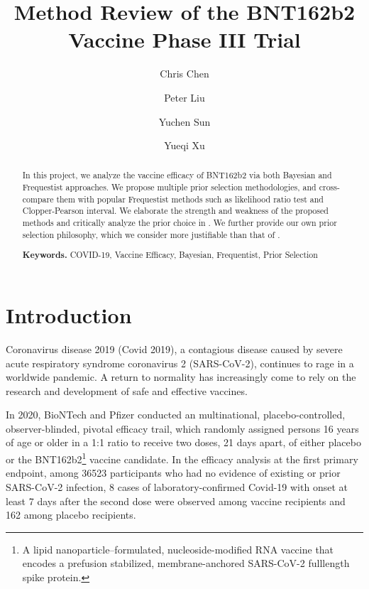 \documentclass[12pt]{amsart}
\begin{document}
\author{Chris Chen}
\author{Peter Liu}
\author{Yuchen Sun}
\author{Yueqi Xu}
\title{Method Review of the BNT162b2 Vaccine Phase III Trial}

\begin{abstract}

In this project, we analyze the vaccine efficacy of BNT162b2 via both Bayesian and Frequestist approaches. We propose multiple prior selection methodologies, and cross-compare them with popular Frequestist methods such as likelihood ratio test and Clopper-Pearson interval. We elaborate the strength and weakness of the proposed methods and critically analyze the prior choice in \cite{paper}. We further provide our own prior selection philosophy, which we consider more justifiable than that of \cite{paper}.
\smallskip

\noindent \textbf{Keywords.} COVID-19, Vaccine Efficacy, Bayesian, Frequentist, Prior Selection
\end{abstract}

\maketitle
\section{Introduction}
\label{sec: intro}
Coronavirus disease 2019 (Covid 2019), a contagious disease caused by severe acute respiratory syndrome coronavirus 2 (SARS-CoV-2), continues to rage in a worldwide pandemic. A return to normality has increasingly come to rely on the research and development of safe and effective vaccines.

In 2020, BioNTech and Pfizer conducted an multinational, placebo-controlled, observer-blinded, pivotal efficacy trail, which randomly assigned persons 16 years of age or older in a 1:1 ratio to receive two doses, 21 days apart, of either placebo or the BNT162b2\footnote{A lipid nanoparticle–formulated, nucleoside-modified RNA 
vaccine that encodes a prefusion stabilized, membrane-anchored SARS-CoV-2 fulllength spike protein.} vaccine candidate. In the efficacy analysis at the first primary endpoint, among 36523 participants who had no evidence of existing or prior SARS-CoV-2 infection, 8 cases of laboratory-confirmed Covid-19 with onset at least 7 days after the second dose were observed among vaccine recipients and 162 among placebo recipients.
\end{document}
